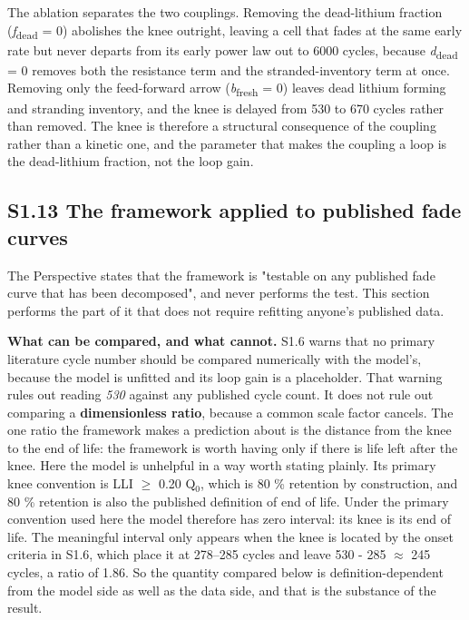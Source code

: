 \documentclass[11pt,a4paper]{article}
\begin{document}
The ablation separates the two couplings. Removing the dead-lithium fraction (\emph{f}\textsubscript{dead} = 0) abolishes the knee outright, leaving a cell that fades at the same early rate but never departs from its early power law out to 6000 cycles, because \emph{d}\textsubscript{dead} = 0 removes both the resistance term and the stranded-inventory term at once. Removing only the feed-forward arrow (\emph{b}\textsubscript{fresh} = 0) leaves dead lithium forming and stranding inventory, and the knee is delayed from 530 to 670 cycles rather than removed. The knee is therefore a structural consequence of the coupling rather than a kinetic one, and the parameter that makes the coupling a loop is the dead-lithium fraction, not the loop gain.


\subsection*{S1.13 The framework applied to published fade curves}


The Perspective states that the framework is "testable on any published fade curve that has been decomposed", and never performs the test. This section performs the part of it that does not require refitting anyone's published data.


\textbf{What can be compared, and what cannot.} S1.6 warns that no primary literature cycle number should be compared numerically with the model's, because the model is unfitted and its loop gain is a placeholder. That warning rules out reading \emph{530} against any published cycle count. It does not rule out comparing a \textbf{dimensionless ratio}, because a common scale factor cancels. The one ratio the framework makes a prediction about is the distance from the knee to the end of life: the framework is worth having only if there is life left after the knee. Here the model is unhelpful in a way worth stating plainly. Its primary knee convention is LLI \ensuremath{\geq} 0.20 Q\ensuremath{_{0}}, which is 80 \% retention by construction, and 80 \% retention is also the published definition of end of life. Under the primary convention used here the model therefore has zero interval: its knee is its end of life. The meaningful interval only appears when the knee is located by the onset criteria in S1.6, which place it at 278--285 cycles and leave 530 - 285 \ensuremath{\approx} 245 cycles, a ratio of 1.86. So the quantity compared below is definition-dependent from the model side as well as the data side, and that is the substance of the result.
\end{document}

